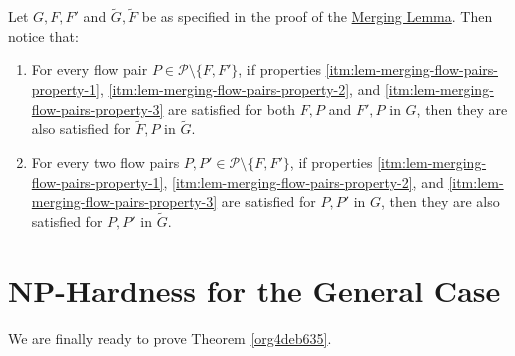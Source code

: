 \documentclass[fontsize=11pt,paper=a4]{book}
\begin{document}
\begin{remark}
Let \(G,F,F'\) and \(\tilde{G},\tilde{F}\) be as specified in the proof of the \hyperref[org44b4347]{Merging Lemma}.
Then notice that:

\begin{enumerate}
\item \label{itm:remark-merging-flow-pairs-1}
For every flow pair \(P\in\mathcal{P}\setminus\{F,F'\}\), if properties \ref{itm:lem-merging-flow-pairs-property-1}, \ref{itm:lem-merging-flow-pairs-property-2}, and \ref{itm:lem-merging-flow-pairs-property-3} are satisfied for both \(F,P\) and \(F',P\) in \(G\), then they are also satisfied for \(\tilde{F},P\) in \(\tilde{G}\).

\item \label{itm:remark-merging-flow-pairs-2}
For every two flow pairs \(P,P'\in\mathcal{P}\setminus\{F,F'\}\), if properties \ref{itm:lem-merging-flow-pairs-property-1}, \ref{itm:lem-merging-flow-pairs-property-2}, and \ref{itm:lem-merging-flow-pairs-property-3} are satisfied for \(P,P'\) in \(G\), then they are also satisfied for \(P,P'\) in \(\tilde{G}\).
\end{enumerate}
\label{org0c6c514}
\end{remark}

\chapter{\(\textbf{NP}\)-Hardness for the General Case}
\label{sec:orgc2ef077}

We are finally ready to prove Theorem \ref{org4deb635}.
\end{document}
